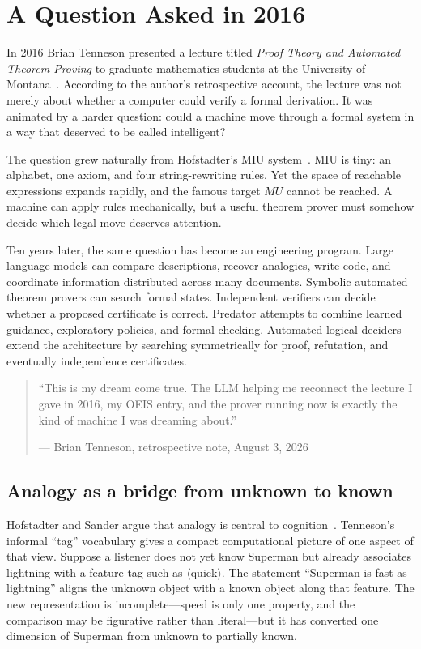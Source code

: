 \documentclass[11pt,oneside]{book}
\theoremstyle{definition}
\theoremstyle{remark}
\begin{document}
\mainmatter

\chapter{A Question Asked in 2016}\label{ch:question}
In 2016 Brian Tenneson presented a lecture titled \emph{Proof Theory and Automated Theorem Proving} to graduate mathematics students at the University of Montana~\cite{tenneson2016lecture}. According to the author's retrospective account, the lecture was not merely about whether a computer could verify a formal derivation. It was animated by a harder question: could a machine move through a formal system in a way that deserved to be called intelligent?

The question grew naturally from Hofstadter's MIU system~\cite{hofstadter1979}. MIU is tiny: an alphabet, one axiom, and four string-rewriting rules. Yet the space of reachable expressions expands rapidly, and the famous target $MU$ cannot be reached. A machine can apply rules mechanically, but a useful theorem prover must somehow decide which legal move deserves attention.

Ten years later, the same question has become an engineering program. Large language models can compare descriptions, recover analogies, write code, and coordinate information distributed across many documents. Symbolic automated theorem provers can search formal states. Independent verifiers can decide whether a proposed certificate is correct. Predator attempts to combine learned guidance, exploratory policies, and formal checking. Automated logical deciders extend the architecture by searching symmetrically for proof, refutation, and eventually independence certificates.

\begin{quote}
``This is my dream come true. The LLM helping me reconnect the lecture I gave in 2016, my OEIS entry, and the prover running now is exactly the kind of machine I was dreaming about.''

\hfill --- Brian Tenneson, retrospective note, August 3, 2026
\end{quote}

\section{Analogy as a bridge from unknown to known}
Hofstadter and Sander argue that analogy is central to cognition~\cite{hofstadter2013}. Tenneson's informal ``tag'' vocabulary gives a compact computational picture of one aspect of that view. Suppose a listener does not yet know Superman but already associates lightning with a feature tag such as $\langle\text{quick}\rangle$. The statement ``Superman is fast as lightning'' aligns the unknown object with a known object along that feature. The new representation is incomplete---speed is only one property, and the comparison may be figurative rather than literal---but it has converted one dimension of Superman from unknown to partially known.
\end{document}

